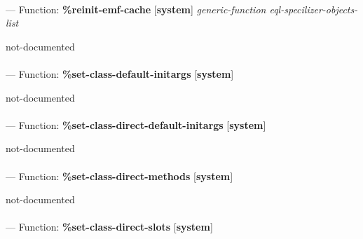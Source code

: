 \paragraph{}
\label{SYSTEM:REINIT-EMF-CACHE}
--- Function: \textbf{\%reinit-emf-cache} [\textbf{system}] \textit{generic-function eql-specilizer-objects-list}

\begin{adjustwidth}{5em}{5em}
not-documented
\end{adjustwidth}

\paragraph{}
\label{SYSTEM:SET-CLASS-DEFAULT-INITARGS}
--- Function: \textbf{\%set-class-default-initargs} [\textbf{system}] \textit{}

\begin{adjustwidth}{5em}{5em}
not-documented
\end{adjustwidth}

\paragraph{}
\label{SYSTEM:SET-CLASS-DIRECT-DEFAULT-INITARGS}
--- Function: \textbf{\%set-class-direct-default-initargs} [\textbf{system}] \textit{}

\begin{adjustwidth}{5em}{5em}
not-documented
\end{adjustwidth}

\paragraph{}
\label{SYSTEM:SET-CLASS-DIRECT-METHODS}
--- Function: \textbf{\%set-class-direct-methods} [\textbf{system}] \textit{}

\begin{adjustwidth}{5em}{5em}
not-documented
\end{adjustwidth}

\paragraph{}
\label{SYSTEM:SET-CLASS-DIRECT-SLOTS}
--- Function: \textbf{\%set-class-direct-slots} [\textbf{system}] \textit{}

